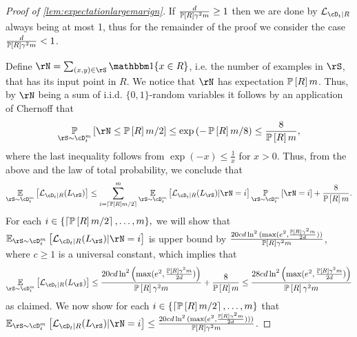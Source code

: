 \begin{proof}[Proof of \cref{lem:expectationlargemarign}]
    If $ \frac{d}{\operatorname*{\mathbb{P}}\left[R\right]\gamma^{2}m} \geq1$ then we are done by $ \ls_{\cD_{t}|R} $ always being at most 1, thus for the remainder of the proof we consider the case $ \frac{d}{\operatorname*{\mathbb{P}}\left[R\right]\gamma^{2}m} <1$.
    
    Define $ \rN=\sum_{(x,y)\in \rS} \ind\{x\in R  \}   $, i.e. the number of examples in $ \rS $, that has its input point in $ R $. We notice that $ \rN $ has expectation $ \operatorname*{\mathbb{P}}\left[R\right]m $. Thus, by $ \rN $ being a sum of i.i.d. $ \{  0,1\}  $-random variables it follows by an application of Chernoff that 
    \begin{align*}
     \p_{\rS\sim \cD_{t}^{m}}\left[\rN\leq \p\left[R\right]m/2\right]\leq  \exp{\left(-\p\left[R\right]m/8 \right)}\leq \frac{8}{\p\left[R\right]m},  
    \end{align*} 
    where the last inequality follows from $ \exp(-x)\leq \frac{1}{x} $ for $ x>0 $.
    Thus, from the above and the law of total probability, we conclude that 
    \begin{align}\label{eq:condtionalexpectation-1}
     \e_{\rS\sim \cD_{t}^{m}}\left[\ls_{\cD_{t}|R}(L_{\rS})\right] 
      \leq \sum_{i=\left\lceil\p\left[R\right]m/2\right\rceil}^{m} \e_{\rS\sim \cD_{t}^{m}}\left[\ls_{\cD_{t}|R}(L_{\rS})|\rN=i \right]\p_{\rS\sim \cD_{t}^{m}}\left[\rN=i\right] +\frac{8}{\p\left[R\right]m}.
    \end{align}
    For each $ i\in \{\left\lceil\operatorname*{\mathbb{P}}\left[R\right]m/2\right\rceil,\ldots,m  \} ,$ we will show that $ \e_{\rS\sim \cD_{t}^{m}}\left[\ls_{\cD_{t}|R}(L_{\rS})|\rN=i \right]$ is upper bound by $\frac{20 cd\ln^{2}{( \max(e^{2},\frac{\operatorname*{\mathbb{P}}\left[R\right]\gamma^{2}m}{2d}))}}{\operatorname*{\mathbb{P}}\left[R\right]\gamma^{2}m} $, where $ c \geq 1$ is a universal constant, which implies that
    \begin{align*}
        \e_{\rS\sim \cD_{t}^{m}}\left[\ls_{\cD_{t}|R}(L_{\rS})\right] \leq  \frac{20cd\ln^{2}{\left( \max(e^{2},\frac{\p\left[R\right]\gamma^{2}m}{2d})\right)}}{\p\left[R\right]\gamma^{2}m}+\frac{8}{\p\left[R\right]m}\leq\frac{28cd\ln^{2}{\left( \max(e^{2},\frac{\p\left[R\right]\gamma^{2}m}{2d})\right)}}{\p\left[R\right]\gamma^{2}m}
    \end{align*}
    as claimed. We now show for each $ i\in \{\left\lceil\operatorname*{\mathbb{P}}\left[R\right]m/2\right\rceil,\ldots,m  \}  $ that $ \e_{\rS\sim \cD_{t}^{m}}\left[\ls_{\cD_{t}|R}(L_{\rS})|\rN=i \right]\leq \frac{20 cd\ln^{2}{( \max(e^{2},\frac{\p\left[R\right]\gamma^{2}m}{2d})))}}{\p\left[R\right]\gamma^{2}m}$.


\end{proof}

